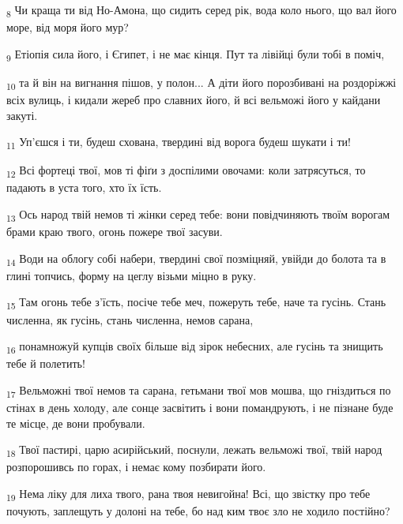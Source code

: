\begin{tcolorbox}
\textsubscript{8} Чи краща ти від Но-Амона, що сидить серед рік, вода коло нього, що вал його море, від моря його мур?
\end{tcolorbox}
\begin{tcolorbox}
\textsubscript{9} Етіопія сила його, і Єгипет, і не має кінця. Пут та лівійці були тобі в поміч,
\end{tcolorbox}
\begin{tcolorbox}
\textsubscript{10} та й він на вигнання пішов, у полон... А діти його порозбивані на роздоріжжі всіх вулиць, і кидали жереб про славних його, й всі вельможі його у кайдани закуті.
\end{tcolorbox}
\begin{tcolorbox}
\textsubscript{11} Уп'єшся і ти, будеш схована, твердині від ворога будеш шукати і ти!
\end{tcolorbox}
\begin{tcolorbox}
\textsubscript{12} Всі фортеці твої, мов ті фіґи з доспілими овочами: коли затрясуться, то падають в уста того, хто їх їсть.
\end{tcolorbox}
\begin{tcolorbox}
\textsubscript{13} Ось народ твій немов ті жінки серед тебе: вони повідчиняють твоїм ворогам брами краю твого, огонь пожере твої засуви.
\end{tcolorbox}
\begin{tcolorbox}
\textsubscript{14} Води на облогу собі набери, твердині свої позміцняй, увійди до болота та в глині топчись, форму на цеглу візьми міцно в руку.
\end{tcolorbox}
\begin{tcolorbox}
\textsubscript{15} Там огонь тебе з'їсть, посіче тебе меч, пожеруть тебе, наче та гусінь. Стань численна, як гусінь, стань численна, немов сарана,
\end{tcolorbox}
\begin{tcolorbox}
\textsubscript{16} понамножуй купців своїх більше від зірок небесних, але гусінь та знищить тебе й полетить!
\end{tcolorbox}
\begin{tcolorbox}
\textsubscript{17} Вельможні твої немов та сарана, гетьмани твої мов мошва, що гніздиться по стінах в день холоду, але сонце засвітить і вони помандрують, і не пізнане буде те місце, де вони пробували.
\end{tcolorbox}
\begin{tcolorbox}
\textsubscript{18} Твої пастирі, царю асирійський, поснули, лежать вельможі твої, твій народ розпорошивсь по горах, і немає кому позбирати його.
\end{tcolorbox}
\begin{tcolorbox}
\textsubscript{19} Нема ліку для лиха твого, рана твоя невигойна! Всі, що звістку про тебе почують, заплещуть у долоні на тебе, бо над ким твоє зло не ходило постійно?
\end{tcolorbox}
